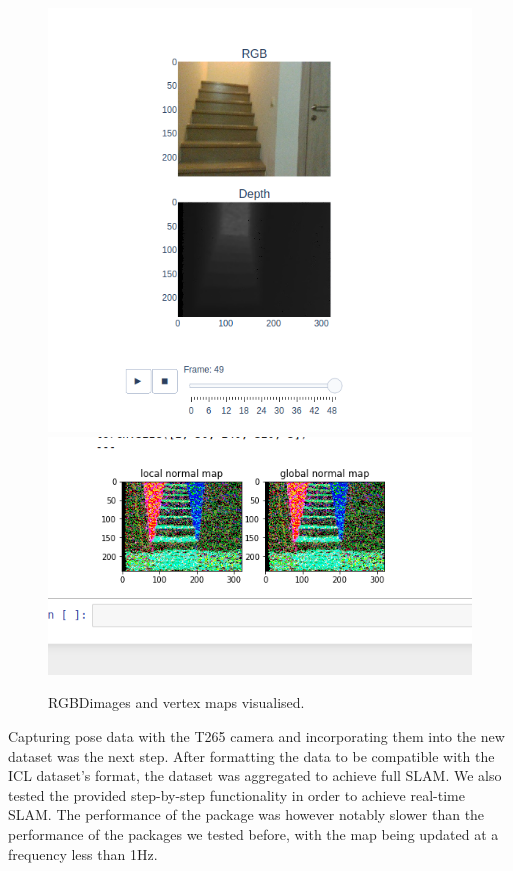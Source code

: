 \documentclass{article}
\begin{document}
\begin{figure}[h] %
    \centering
	\includegraphics[width=\textwidth,height=\textheight,keepaspectratio]{report1-img019.png} %
	\includegraphics[width=\textwidth,height=\textheight,keepaspectratio,trim={0 4cm 0 1cm},clip]{report1-img020.png} %
	\caption{RGBDimages and vertex maps visualised. }
\end{figure}

\clearpage

Capturing pose data with the T265 camera and incorporating them into the new dataset was the next step. After formatting the data to be compatible with the ICL dataset’s format, the dataset was aggregated to achieve full SLAM. We also tested the provided step-by-step functionality in order to achieve real-time SLAM. The performance of the package was however notably slower than the performance of the packages we tested before, with the map being updated at a frequency less than 1Hz. 
\end{document}
